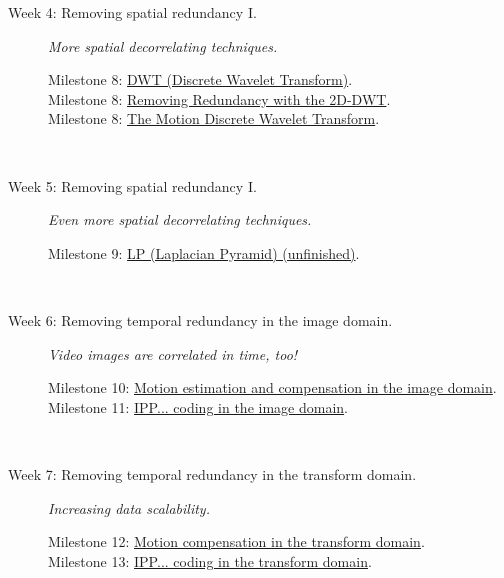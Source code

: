 \begin{description}
\item [Week 4: {\normalfont Removing spatial redundancy I.}]
  \emph{More spatial decorrelating techniques.}
  \begin{description}
  \item [Milestone 8: {\normalfont \href{https://sistemas-multimedia.github.io/milestones/07-DWT/}{DWT (Discrete Wavelet Transform)}.}] %
  \item [Milestone 8: {\normalfont \href{https://sistemas-multimedia.github.io/milestones/08-2D-DWT/}{Removing Redundancy with the 2D-DWT}.}] %
  \item [Milestone 8: {\normalfont \href{https://sistemas-multimedia.github.io/milestones/09-MDWT/}{The Motion Discrete Wavelet Transform}.}] %
  \end{description}
  ~\newline

\item [Week 5: {\normalfont Removing spatial redundancy I.}]
  \emph{Even more spatial decorrelating techniques.}
  \begin{description}
 \item [Milestone 9: {\normalfont \href{}{LP (Laplacian Pyramid) (unfinished)}.}]
  \end{description}
  ~\newline

\item [Week 6: {\normalfont Removing temporal redundancy in the image domain.}]
  \emph{Video images are correlated in time, too!}
  \begin{description}
  \item [Milestone 10: {\normalfont \href{https://sistemas-multimedia.github.io/milestones/10-ME/}{Motion estimation and compensation in the image domain}.}]
  \item [Milestone 11: {\normalfont \href{https://sistemas-multimedia.github.io/milestones/11-image_domain_IPP/}{IPP... coding in the image domain}.}]
  \end{description}
  ~\newline

\item [Week 7: {\normalfont Removing temporal redundancy in the transform domain.}]
  \emph{Increasing data scalability.}
  \begin{description}
  \item [Milestone 12: {\normalfont \href{https://sistemas-multimedia.github.io/milestones/12-transform_domain_MC/}{Motion compensation in the transform domain}.}]
  \item [Milestone 13: {\normalfont \href{https://sistemas-multimedia.github.io/milestones/13-transform_domain_IPP/}{IPP... coding in the transform domain}.}]
  \end{description}
  ~\newline


\end{description}
